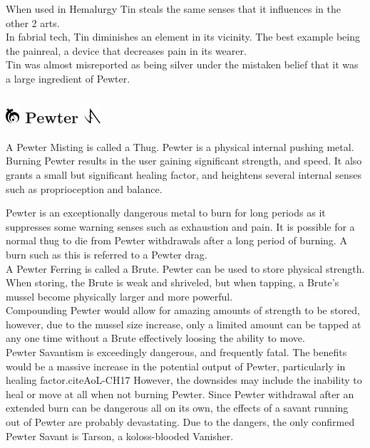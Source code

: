 \documentclass[conference]{IEEEtran}
\begin{document}
When used in Hemalurgy Tin steals the same senses that it influences in the other 2 arts.\cite{HE-TB}\\

In fabrial tech, Tin diminishes an element in its vicinity.  The best example being the painreal, a device that decreases pain in its wearer.\cite{RoW-E10}\\

Tin was almost misreported as being silver under the mistaken belief that it was a large ingredient of Pewter.\cite{tin-trivia}
\subsection*{\includegraphics[height=1em]{images/Pewter.png}  Pewter \includegraphics[height=1em]{images/Pewter_(Feruchemy).png}}
A Pewter Misting is called a Thug.\cite{ARS}  Pewter is a physical internal pushing metal.\cite{AL-TB}  Burning Pewter results in the user gaining significant strength, and speed.\cite{ARS}  It also grants a small but significant healing factor,\cite{HoA-CH26} and heightens several internal senses such as proprioception and balance.\cite{TFE-CH5}

Pewter is an exceptionally dangerous metal to burn for long periods\cite{TFE-CH24}\cite{TFE-CH25} as it suppresses some warning senses such as exhaustion and pain.\cite{TFE-CH7}  It is possible for a normal thug to die from Pewter withdrawals after a long period of burning.  A burn such as this is referred to a Pewter drag.\cite{TFE-CH26}\\

A Pewter Ferring is called a Brute.\cite{ARS}  Pewter can be used to store physical strength.  When storing, the Brute is weak and shriveled, but when tapping, a Brute's mussel become physically larger and more powerful.\cite{WoA-CH53} \\

Compounding Pewter would allow for amazing amounts of strength to be stored, however, due to the mussel size increase, only a limited amount can be tapped at any one time without a Brute effectively loosing the ability to move.\cite{Bodybuilder}\\

Pewter Savantism is exceedingly dangerous, and frequently fatal.\cite{WoF}  The benefits would be a massive increase in the potential output of Pewter, particularly in healing factor.cite{AoL-CH17}  However, the downsides may include the inability to heal or move at all when not burning Pewter.\cite{HoA-CH56}  Since Pewter withdrawal after an extended burn can be dangerous all on its own, the effects of a savant running out of Pewter are probably devastating.\cite{WoF}  Due to the dangers, the only confirmed Pewter Savant is Tarson, a koloss-blooded Vanisher.\cite{AoL-CH17}\\
\end{document}
